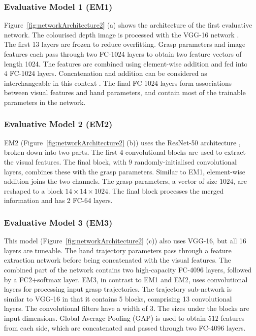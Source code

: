 \subsubsection{Evaluative Model 1 (EM1)}
\noindent
Figure~\ref{fig:networkArchitecture2} (a) shows the architecture of the first evaluative network. The colourised depth image is processed with the VGG-16 network \cite{Simonyan14c}. The first 13 layers are frozen to reduce overfitting. Grasp parameters and image features each pass through two FC-1024 layers to obtain two feature vectors of length 1024. The features are combined using element-wise addition and fed into 4 FC-1024 layers. Concatenation and addition can be considered as interchangeable in this context \cite{dumoulin2018feature-wise}. The final FC-1024 layers form associations between visual features and hand parameters, and contain most of the trainable parameters in the network.

\subsubsection{Evaluative Model 2 (EM2)}
\noindent

EM2 (Figure~\ref{fig:networkArchitecture2} (b)) uses the ResNet-50 architecture \cite{HeZRS15}, broken down into two parts. The first 4 convolutional blocks are used to extract the visual features. The final block, with 9 randomly-initialised convolutional layers, combines these with the grasp parameters. Similar to EM1, element-wise addition joins the two channels. The grasp parameters, a vector of size $1024$, are reshaped to a block $14 \times 14 \times 1024$. The final block processes the merged information and has 2 FC-64 layers.

\subsubsection{Evaluative Model 3 (EM3)}
\noindent
This model (Figure~\ref{fig:networkArchitecture2} (c)) also uses VGG-16, but all 16 layers are tuneable. The hand trajectory parameters pass through a feature extraction network before being concatenated with the visual features. The combined part of the network contains two high-capacity FC-4096 layers, followed by a FC2+softmax layer. EM3, in contrast to EM1 and EM2, uses convolutional layers for processing input grasp trajectories. The trajectory sub-network is similar to VGG-16 in that it contains 5 blocks, comprising 13 convolutional layers. The convolutional filters have a width of 3. The sizes under the blocks are input dimensions. Global Average Pooling (GAP) is used to obtain 512 features from each side, which are concatenated and passed through two FC-4096 layers. 

